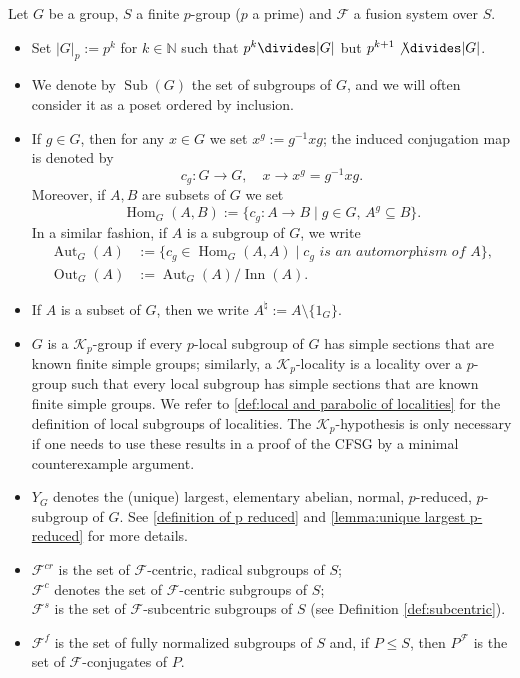 \documentclass{amsart}
\numberwithin{equation}{section}
\theoremstyle{definition}
\theoremstyle{subresult}
\theoremstyle{caseresult}
\newcommand{\bN}{\mathbb{N}}
\newcommand{\F}{\mathcal{F}}
\newcommand{\K}{\mathcal{K}}
\newcommand{\Hom}{\operatorname{Hom}}
\newcommand{\Aut}{\operatorname{Aut}}
\newcommand{\Out}{\operatorname{Out}}
\newcommand{\Inn}{\operatorname{Inn}}
\newcommand{\Sub}{\operatorname{Sub}}
\newcommand{\inv}{^{-1}}
\newcommand{\fto}{\longrightarrow}
\newcommand{\<}{\langle}
\renewcommand{\>}{\rangle}
\begin{document}
Let $G$ be a group, $S$ a finite $p$-group ($p$ a prime) and $\F$ a fusion system over $S$.
\begin{itemize}
	\item Set $|G|_p := p^k$ for $k \in \bN$ such that $p^k \divides |G|$ but $p^{k+1} \not \divides |G|$.
	\item We denote by $\Sub(G)$ the set of subgroups of $G$, and we will often consider it as a poset ordered by inclusion.
    \item If $g \in G$, then for any $x \in G$ we set $x^g := g\inv x g$; the induced conjugation map is denoted by
    \[
    c_g : G \fto G, \quad x \fto x^g = g\inv x g.
    \]
    Moreover, if $A,B$ are subsets of $G$ we set
    \[
    \Hom_G(A,B) := \{c_g :A \fto B \mid g \in G, \, A^g \subseteq B \}.
    \]
    In a similar fashion, if $A$ is a subgroup of $G$, we write
    \begin{align*}
        \Aut_G(A) &:= \{c_g \in \Hom_G(A,A) \mid \textit{$c_g$ is an automorphism of $A$} \},\\
        \Out_G(A) &:= \Aut_G(A) / \Inn(A).
    \end{align*}
    \item If $A$ is a subset of $G$, then we write $A^\natural := A \setminus \{1_G\}$.
    \item $G$ is a $\K_p$-group if every $p$-local subgroup of $G$ has simple sections that are known finite simple groups; similarly, a $\K_p$-locality is a locality over a $p$-group such that every local subgroup has simple sections that are known finite simple groups. We refer to \ref{def:local and parabolic of localities} for the definition of local subgroups of localities. The $\K_p$-hypothesis is only necessary if one needs to use these results in a proof of the CFSG by a minimal counterexample argument.
    \item $Y_G$ denotes the (unique) largest, elementary abelian, normal, $p$-reduced, $p$-subgroup of $G$. See \ref{definition of p reduced} and \ref{lemma:unique largest p-reduced} for more details.
    \item $\F^{cr}$ is the set of $\F$-centric, radical subgroups of $S$; \\
     $\F^c$ denotes the set of $\F$-centric subgroups of $S$; \\
      $\F^s$ is the set of $\F$-subcentric subgroups of $S$ (see Definition \ref{def:subcentric}).
    \item $\F^f$ is the set of fully normalized subgroups of $S$ and, if $P \le S$, then $P^\F$ is the set of $\F$-conjugates of $P$.
\end{itemize}
\end{document}
